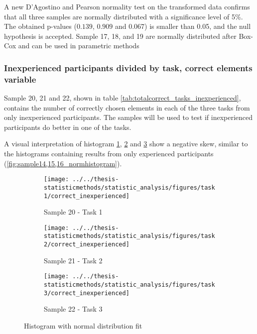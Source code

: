 A new D'Agostino and Pearson normality test on the transformed data confirms that all three samples are normally distributed with a significance level of 5\%. The obtained p-values ($0.139$, $0.909$ and $0.067$) is smaller than 0.05, and the null hypothesis is accepted. Sample 17, 18, and 19 are normally distributed after Box-Cox and can be used in parametric methods \\[0.2cm]

\subsubsection[Sample 20, 21 and 22]{Inexperienced participants  divided by task, correct elements variable}\label{sec:sample_20,21,22_normalitytest}
Sample 20, 21 and 22, shown in table \ref{tab:totalcorrect_tasks_inexperienced}, contains the number of correctly chosen elements in each of the three tasks from only inexperienced participants. The samples will be used to test if inexperienced participants do better in one of the tasks. 

A visual interpretation of histogram \ref{fig:correctinexperienced_task1}, \ref{fig:correctinexperienced_task2} and \ref{fig:correctinexperienced_task3} show a negative skew, similar to the histograms containing results from only experienced participants (\ref{fig:sample14,15,16_normhistogram}).

\begin{figure}[H]
	\centering
	\begin{subfigure}[b]{0.32\textwidth}
		\centering
		\texttt{[image: ../../thesis-statisticmethods/statistic\_analysis/figures/task1/correct\_inexperienced]}
		\caption{Sample 20 - Task 1}
		\label{fig:correctinexperienced_task1}
	\end{subfigure}
	\begin{subfigure}[b]{0.32\textwidth}
		\centering
		\texttt{[image: ../../thesis-statisticmethods/statistic\_analysis/figures/task2/correct\_inexperienced]}
		\caption{Sample 21 - Task 2}
		\label{fig:correctinexperienced_task2}
	\end{subfigure}
	\begin{subfigure}[b]{0.32\textwidth}
		\centering
		\texttt{[image: ../../thesis-statisticmethods/statistic\_analysis/figures/task3/correct\_inexperienced]}
		\caption{Sample 22 - Task 3}
		\label{fig:correctinexperienced_task3}
	\end{subfigure}
	\caption{Histogram with normal distribution fit}
	\label{fig:sample20,21,22_normtest_original}
\end{figure}

